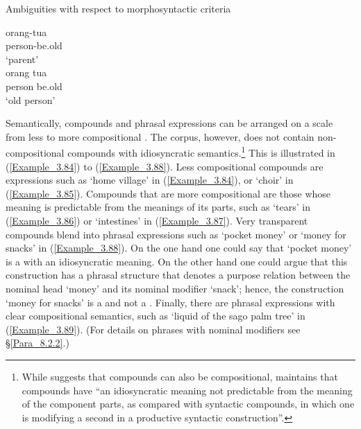 \begin{styleExampleTitle}
{Ambiguities with respect to morphosyntactic criteria}
\end{styleExampleTitle} 
\ea
\label{Example_3.82}
\gll orang-tua\\ %
{person-be.old}\\
 \glt ‘parent’\\
\z 
\ea
\label{Example_3.83}
\gll orang tua\\ %
{person} {be.old}\\
 \glt ‘old person’\\
\z 


Semantically, compounds and phrasal expressions can be arranged on a scale from less to more compositional \citep[28]{Aikhenvald.2007}. The corpus, however, does not contain non-compositional compounds with idiosyncratic semantics.\footnote{While {\citet[28]{Aikhenvald.2007}} suggests that compounds can also be compositional, \citet[175]{Dryer.2007b} maintains that compounds have “an idiosyncratic meaning not predictable from the meaning of the component parts, as compared with syntactic compounds, in which one  is modifying a second  in a productive syntactic construction”.} This is illustrated in (\ref{Example_3.84}) to (\ref{Example_3.88}). Less compositional compounds are expressions such as  ‘home village’ in (\ref{Example_3.84}), or  ‘choir’ in (\ref{Example_3.85}). Compounds that are more compositional are those whose meaning is predictable from the meanings of its parts, such as  ‘tears’ in (\ref{Example_3.86}) or  ‘intestines’ in (\ref{Example_3.87}). Very transparent compounds blend into phrasal expressions such as  ‘pocket money’ or ‘money for snacks’ in (\ref{Example_3.88}). On the one hand one could say that  ‘pocket money’ is a  with an idiosyncratic meaning. On the other hand one could argue that this construction has a phrasal structure that denotes a purpose relation between the nominal head  ‘money’ and its nominal modifier  ‘snack’; hence, the construction  ‘money for snacks’ is a  and not a . Finally, there are phrasal expressions with clear compositional semantics, such as  ‘liquid of the sago palm tree’ in (\ref{Example_3.89}). (For details on  phrases with nominal modifiers see §\ref{Para_8.2.2}.)



